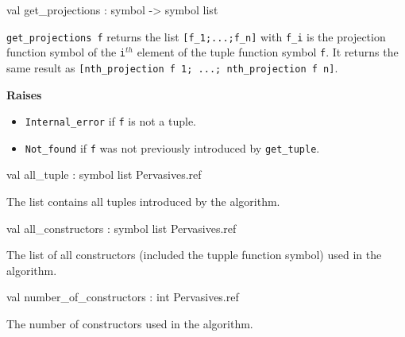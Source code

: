 \label{val:Term.get-underscoreprojections}\begin{ocamldoccode}
val get_projections : symbol -> symbol list
\end{ocamldoccode}
\begin{ocamldocdescription}
{\tt{get\_projections f}} returns the list {\tt{[f\_1;...;f\_n]}} with {\tt{f\_i}} is the projection 
    function symbol of the {\tt{i}}$^{th}$ element of the tuple function symbol {\tt{f}}.
    It returns the same result as {\tt{[nth\_projection f 1; ...; nth\_projection f n]}}.

{\bf Raises} \begin{itemize}
\item {\tt{Internal\_error}} if {\tt{f}} is not a tuple.
\item {\tt{Not\_found}} if {\tt{f}} was not previously introduced by {\tt{get\_tuple}}.
\end{itemize}



\end{ocamldocdescription}




\label{val:Term.all-underscoretuple}\begin{ocamldoccode}
val all_tuple : symbol list Pervasives.ref
\end{ocamldoccode}
\begin{ocamldocdescription}
The list contains all tuples introduced by the algorithm.


\end{ocamldocdescription}




\label{val:Term.all-underscoreconstructors}\begin{ocamldoccode}
val all_constructors : symbol list Pervasives.ref
\end{ocamldoccode}
\begin{ocamldocdescription}
The list of all constructors (included the tupple function symbol) used in the algorithm.


\end{ocamldocdescription}




\label{val:Term.number-underscoreof-underscoreconstructors}\begin{ocamldoccode}
val number_of_constructors : int Pervasives.ref
\end{ocamldoccode}
\begin{ocamldocdescription}
The number of constructors used in the algorithm.


\end{ocamldocdescription}




